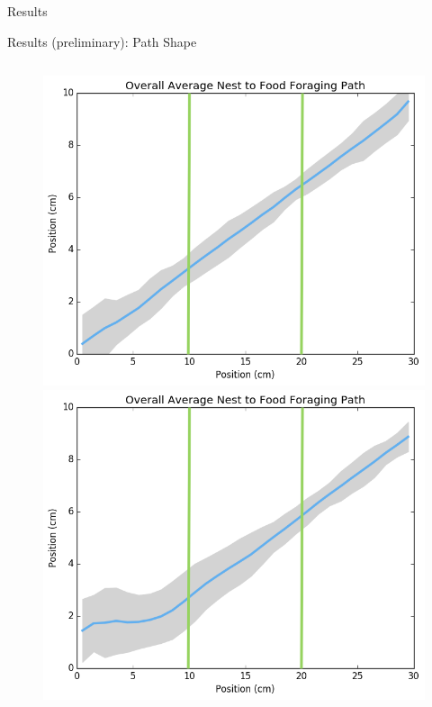 \begin{section}{Results}


\begin{frame}{Results (preliminary): Path Shape}
\begin{figure}
\begin{columns}[T,onlytextwidth]
\includegraphics[width=\textwidth]{results/corner-to-corner-average_path_negpidiv3.png}
\includegraphics[width=\textwidth]{results/corner-to-corner-average_path_0.png}

\end{columns}
\end{figure}
\end{frame}
\end{section}
